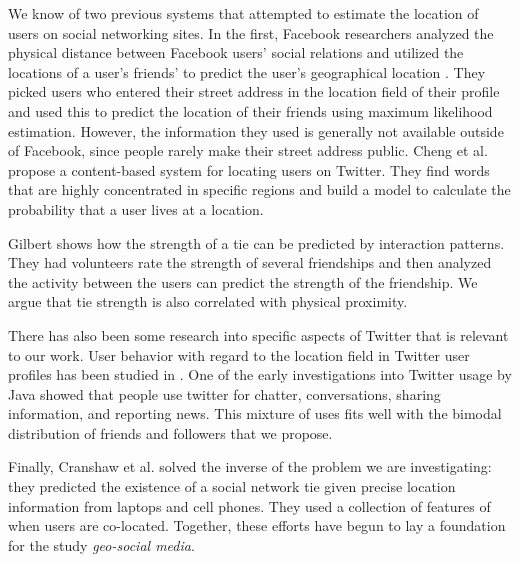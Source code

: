 We know of two previous systems that attempted to estimate the location of
users on social networking sites.
In the first, Facebook researchers analyzed the physical distance between Facebook users'
social relations and utilized the locations of a user's friends' to predict the
user's geographical location \cite{backstrom2010find}.
They picked users who entered their street address
in the location field of their profile and used this to predict the location of
their friends using maximum likelihood estimation.  However, the information
they used is generally not available outside of Facebook, since people rarely
make their street address public.
Cheng et al. \cite{cheng2010you} propose a
content-based system for locating users on Twitter. They find words that are
highly concentrated in specific regions and build a model to calculate the
probability that a user lives at a location.

Gilbert \cite{gilbert2009predicting} shows how the strength of a tie can be predicted by interaction patterns.
They had volunteers rate the strength of several friendships and then analyzed
the activity between the users can predict the strength of the friendship.
We argue that tie strength is also correlated with physical proximity.

There has also been some research into specific aspects of Twitter that is relevant to our work.
User behavior with regard to the location field in Twitter user profiles has been studied in \cite{hecht2011tweets}.
One of the early investigations into Twitter usage by Java \cite{java2007we} showed that people
use twitter for chatter, conversations, sharing information, and reporting
news.
This mixture of uses fits well with the bimodal distribution of friends and followers that we propose.

Finally, Cranshaw et al. \cite{cranshaw2010bridging} solved the inverse of the
problem we are investigating: they predicted the existence of a social network
tie given precise location information from laptops and cell phones. They used
a collection of features of when users are co-located.
Together, these efforts have begun to lay a foundation for the study \textit{geo-social media}.

